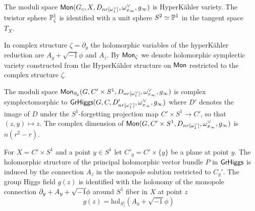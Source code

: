 \documentclass[12pt,psamsfonts,reqno]{amsart}
\begin{document}
\begin{proposition}
  The moduli space $\mathsf{Mon}(G_{c}, X, D_{nr[\omega_1^{\vee}]}, \omega_{x_\infty}^{\vee},  g_{\infty})$ is HyperK\"ahler variety.
  The twistor sphere $\mathbb P^1_{\zeta}$ is identified with a unit sphere $S^2 \simeq \mathbb P^1$ in the tangent space $T_{X}$.
\end{proposition}

\begin{definition}
 In complex structure $\zeta = \partial_{y}$ the holomorphic variables of the hyperK\"ahler reduction
  are $A_y + \sqrt{-1} \phi$ and $A_{\bar z}$. By $\mathsf{Mon}_{\zeta}$
  we denote holomorphic symplectic variety constructed from the HyperK\"ahler structure on $\mathsf{Mon}$ restricted
  to the complex structure $\zeta$.  
\end{definition}


  
\begin{lemma}
  The moduli space $\mathsf{Mon}_{\partial_y}(G, C' \times S^1, D_{nr[\omega_1^{\vee}]}, \omega_{x_\infty}^{\vee}, g_{\infty})$
  is complex symplectomorphic to $\mathsf{GrHiggs}(G, C, D'_{nr[\omega_1^{\vee}]}, \omega_{x_\infty}^{\vee}, g_{\infty})$
  where $D'$ denotes the image of $D$ under the $S^1$-forgetting projection map $C' \times S^1 \to C'$,
  so that $(z, y) \mapsto z$. The complex dimension of $\mathsf{Mon}(G, C' \times S^1, D_{nr[\omega_1^{\vee}]}, \omega_{x_\infty}^{\vee}, g_{\infty})$ is $n(r^2-r)$. 
\end{lemma}

For $X = C' \times S^1$ and a point $y \in S^1$ let $C'_y = C' \times \{y\}$ be a plane at point $y$. 
The holomorphic structure of the principal holomorphic vector bundle $P$ in $\mathsf{GrHiggs}$ is
induced by the connection $A_{\bar z}$ in the monopole solution restricted to $C_y'$.
The group Higgs field $g(z)$ is identified with  the holonomy of the 
monopole connection $\partial_{y} + A_{y} + \sqrt{-1} \phi$
around $S^1$ fiber in $X$ at point $z$
\begin{equation}
  g(z) = \mathrm{hol}_{S^{1}_{z}} ( A_{y} + \sqrt{-1} \phi)
\end{equation}





  
  
  
\end{document}
